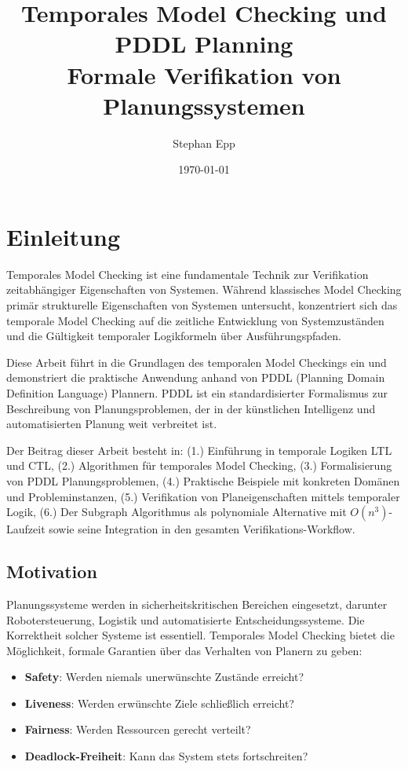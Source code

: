 ﻿\documentclass[a4paper,12pt]{article}
\title{Temporales Model Checking und PDDL Planning\\
	\large{Formale Verifikation von Planungssystemen}}
\author{Stephan Epp}
\date{\today}
\theoremstyle{definition}
\begin{document}
	
\maketitle

\tableofcontents
\newpage

\section{Einleitung}

Temporales Model Checking ist eine fundamentale Technik zur Verifikation zeitabhängiger Eigenschaften von Systemen. Während klassisches Model Checking primär strukturelle Eigenschaften von Systemen untersucht, konzentriert sich das temporale Model Checking auf die zeitliche Entwicklung von Systemzuständen und die Gültigkeit temporaler Logikformeln über Ausführungspfaden.

Diese Arbeit führt in die Grundlagen des temporalen Model Checkings ein und demonstriert die praktische Anwendung anhand von PDDL (Planning Domain Definition Language) Plannern. PDDL ist ein standardisierter Formalismus zur Beschreibung von Planungsproblemen, der in der künstlichen Intelligenz und automatisierten Planung weit verbreitet ist.

Der Beitrag dieser Arbeit besteht in: (1.) Einführung in temporale Logiken LTL und CTL, (2.) Algorithmen für temporales Model Checking, (3.) Formalisierung von PDDL Planungsproblemen, (4.) Praktische Beispiele mit konkreten Domänen und Probleminstanzen, (5.) Verifikation von Planeigenschaften mittels temporaler Logik, (6.) Der Subgraph Algorithmus als polynomiale Alternative mit $O(n^3)$-Laufzeit sowie seine Integration in den gesamten Verifikations-Workflow.

\subsection{Motivation}

Planungssysteme werden in sicherheitskritischen Bereichen eingesetzt, darunter Robotersteuerung, Logistik und automatisierte Entscheidungssysteme. Die Korrektheit solcher Systeme ist essentiell. Temporales Model Checking bietet die Möglichkeit, formale Garantien über das Verhalten von Planern zu geben:

\begin{itemize}
	\item[-] \textbf{Safety}: Werden niemals unerwünschte Zustände erreicht?
	\item[-] \textbf{Liveness}: Werden erwünschte Ziele schließlich erreicht?
	\item[-] \textbf{Fairness}: Werden Ressourcen gerecht verteilt?
	\item[-] \textbf{Deadlock-Freiheit}: Kann das System stets fortschreiten?
\end{itemize}
\end{document}

